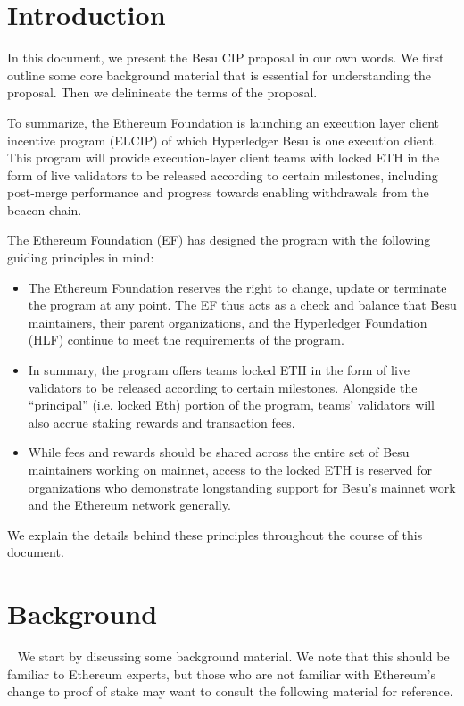
\section{Introduction} \label{sec:introduction}

In this document, we present the Besu CIP proposal in our own words.  We first outline some core background material that is essential for understanding the proposal.  Then we delinineate the terms of the proposal.

To summarize, the Ethereum Foundation is launching an execution layer client incentive program (ELCIP) of which Hyperledger Besu is one execution client. This program will provide execution-layer client teams with locked ETH in the form of live validators to be released according to certain milestones, including post-merge performance and progress towards enabling withdrawals from the beacon chain.

The Ethereum Foundation (EF) has designed the program with the following guiding principles in mind:

\begin{itemize}
\item The Ethereum Foundation reserves the right to change, update or terminate the program at any point. The EF thus acts as a check and balance that Besu maintainers, their parent organizations, and the Hyperledger Foundation (HLF) continue to meet the requirements of the program.
\item In summary, the program offers teams locked ETH in the form of live validators to be released according to certain milestones. Alongside the “principal” (i.e. locked Eth) portion of the program, teams’ validators will also accrue staking rewards and transaction fees.
\item While fees and rewards should be shared across the entire set of Besu maintainers working on mainnet, access to the locked ETH is reserved for organizations who demonstrate longstanding support for Besu’s mainnet work and the Ethereum network generally.
\end{itemize}
We explain the details behind these principles throughout the course of this document.

\section{Background}~\label{sec:background}
We start by discussing some background material.  We note that this should be familiar to Ethereum experts, but those who are not familiar with Ethereum's change to proof of stake may want to consult the following material for reference.

